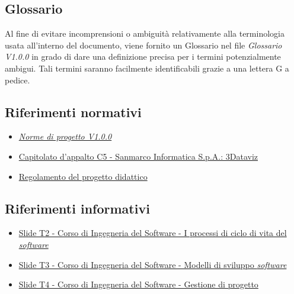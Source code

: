 \subsection{Glossario}
Al fine di evitare incomprensioni o ambiguità relativamente alla terminologia
usata all'interno del documento, viene fornito un Glossario nel file
\textit{Glossario V1.0.0} in grado di dare una definizione precisa per i
termini potenzialmente ambigui. Tali termini saranno facilmente identificabili
grazie a una lettera G a pedice.
\subsection{Riferimenti normativi}
\begin{itemize}
    \item \href{URL}{\textit{Norme di progetto V1.0.0}}
    \item \href{https://www.math.unipd.it/~tullio/IS-1/2024/Progetto/C5.pdf}
          {Capitolato d'appalto C5 - Sanmarco Informatica S.p.A.: 3Dataviz}
    \item \href{https://www.math.unipd.it/~tullio/IS-1/2024/Dispense/PD1.pdf}
          {Regolamento del progetto didattico}
\end{itemize}
\subsection{Riferimenti informativi}
\begin{itemize}
    \item \href{https://www.math.unipd.it/~tullio/IS-1/2024/Dispense/T02.pdf}
          {Slide T2 - Corso di Ingegneria del Software - I processi di ciclo di vita del \textit{software}}
    \item \href{https://www.math.unipd.it/~tullio/IS-1/2024/Dispense/T03.pdf}
          {Slide T3 - Corso di Ingegneria del Software - Modelli di sviluppo \textit{software}}
    \item \href{https://www.math.unipd.it/~tullio/IS-1/2024/Dispense/T04.pdf}
          {Slide T4 - Corso di Ingegneria del Software - Gestione di progetto}
\end{itemize}
